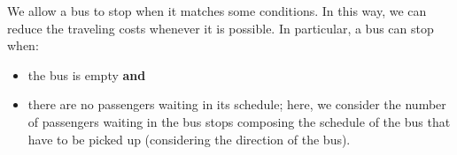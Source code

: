We allow a bus to stop when it matches some conditions. In this way, we can reduce the traveling costs whenever it is possible. In particular, a bus can stop when:

\begin{itemize}
\item the bus is empty \textbf{and}
\item there are no passengers waiting in its schedule; here, we consider the number of passengers waiting in the bus stops composing the schedule of the bus that have to be picked up (considering the direction of the bus).
\end{itemize}
